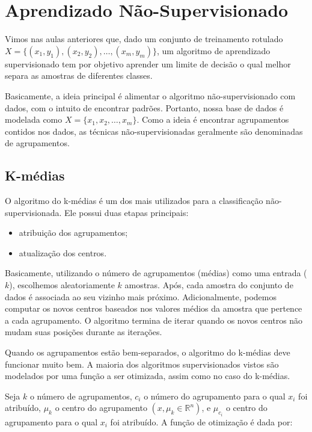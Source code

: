 \section{Aprendizado Não-Supervisionado}
\label{s.unsupervised_learning}

Vimos nas aulas anteriores que, dado um conjunto de treinamento rotulado $X = \{(x_1, y_1), (x_2, y_2), \dots, (x_m, y_m)\}$, um algoritmo de aprendizado supervisionado tem por objetivo aprender um limite de decisão o qual melhor separa as amostras de diferentes classes.

Basicamente, a ideia principal é alimentar o algoritmo não-supervisionado com dados, com o intuito de encontrar padrões. Portanto, nossa base de dados é modelada como $X = \{x_1, x_2, \dots, x_m\}$. Como a ideia é encontrar agrupamentos contidos nos dados, as técnicas não-supervisionadas geralmente são denominadas de agrupamentos.

\subsection{K-médias}
\label{ss.kmeans}

O algoritmo do k-médias é um dos mais utilizados para a classificação não-supervisionada. Ele possui duas etapas principais:

\begin{itemize}
\item atribuição dos agrupamentos;
\item atualização dos centros.	
\end{itemize}

Basicamente, utilizando o número de agrupamentos (médias) como uma entrada ($k$), escolhemos aleatoriamente $k$ amostras. Após, cada amostra do conjunto de dados é associada ao seu vizinho mais próximo. Adicionalmente, podemos computar os novos centros baseados nos valores médios da amostra que pertence a cada agrupamento. O algoritmo termina de iterar quando os novos centros não mudam suas posições durante as iterações.

Quando os agrupamentos estão bem-separados, o algoritmo do k-médias deve funcionar muito bem. A maioria dos algoritmos supervisionados vistos são modelados por uma função a ser otimizada, assim como no caso do k-médias.

Seja $k$ o número de agrupamentos, $c_i$ o número do agrupamento para o qual $x_i$ foi atribuído, $\mu_k$ o centro do agrupamento $(x, \mu_k \in \mathbb{R}^n)$, e $\mu_{c_i}$ o centro do agrupamento para o qual $x_i$ foi atribuído. A função de otimização é dada por:

